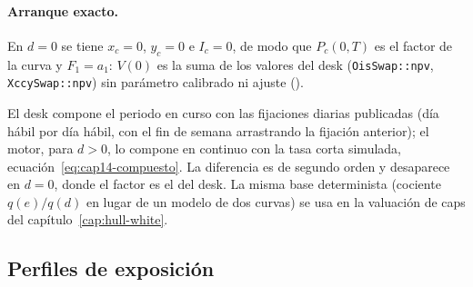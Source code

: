 \begin{sloppypar}
\paragraph{Arranque exacto.} En $d=0$ se tiene $x_c=0$, $y_c=0$ e $I_c=0$, de modo que $P_c(0,T)$ es el factor de la
curva y $F_1=a_1$: $V(0)$ es la suma de los valores del desk (\texttt{OisSwap::npv}, \texttt{XccySwap::npv}) sin
parámetro calibrado ni ajuste ().

\begin{diferencia}
  El desk compone el periodo en curso con las fijaciones diarias publicadas (día hábil por día hábil, con el
  fin de semana arrastrando la fijación anterior); el motor, para $d>0$, lo compone en continuo con la tasa
  corta simulada, ecuación~\eqref{eq:cap14-compuesto}. La diferencia es de segundo orden y desaparece en $d=0$,
  donde el factor es el del desk. La misma base determinista (cociente $q(e)/q(d)$ en lugar de un modelo de dos curvas)
  se usa en la valuación de caps del capítulo~\ref{cap:hull-white}.
\end{diferencia}

\subsection{Perfiles de exposición}\label{sec:cap14-perfiles}


\end{sloppypar}
